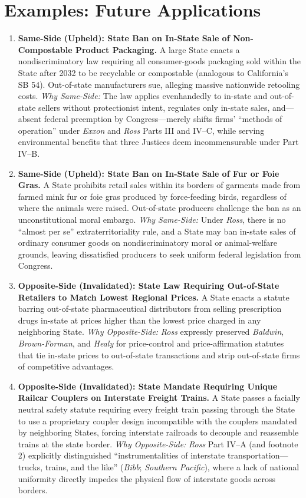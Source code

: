 \documentclass[12pt]{article}
\begin{document}
\section{Examples: Future Applications}
\begin{enumerate}
\item \textbf{Same-Side (Upheld): State Ban on In-State Sale of Non-Compostable Product Packaging.} A large State enacts a nondiscriminatory law requiring all consumer-goods packaging sold within the State after 2032 to be recyclable or compostable (analogous to California's SB 54). Out-of-state manufacturers sue, alleging massive nationwide retooling costs. \textit{Why Same-Side:} The law applies evenhandedly to in-state and out-of-state sellers without protectionist intent, regulates only in-state sales, and---absent federal preemption by Congress---merely shifts firms' ``methods of operation'' under \textit{Exxon} and \textit{Ross} Parts III and IV--C, while serving environmental benefits that three Justices deem incommensurable under Part IV--B.

\item \textbf{Same-Side (Upheld): State Ban on In-State Sale of Fur or Foie Gras.} A State prohibits retail sales within its borders of garments made from farmed mink fur or foie gras produced by force-feeding birds, regardless of where the animals were raised. Out-of-state producers challenge the ban as an unconstitutional moral embargo. \textit{Why Same-Side:} Under \textit{Ross}, there is no ``almost per se'' extraterritoriality rule, and a State may ban in-state sales of ordinary consumer goods on nondiscriminatory moral or animal-welfare grounds, leaving dissatisfied producers to seek uniform federal legislation from Congress.

\item \textbf{Opposite-Side (Invalidated): State Law Requiring Out-of-State Retailers to Match Lowest Regional Prices.} A State enacts a statute barring out-of-state pharmaceutical distributors from selling prescription drugs in-state at prices higher than the lowest price charged in any neighboring State. \textit{Why Opposite-Side:} \textit{Ross} expressly preserved \textit{Baldwin}, \textit{Brown-Forman}, and \textit{Healy} for price-control and price-affirmation statutes that tie in-state prices to out-of-state transactions and strip out-of-state firms of competitive advantages.

\item \textbf{Opposite-Side (Invalidated): State Mandate Requiring Unique Railcar Couplers on Interstate Freight Trains.} A State passes a facially neutral safety statute requiring every freight train passing through the State to use a proprietary coupler design incompatible with the couplers mandated by neighboring States, forcing interstate railroads to decouple and reassemble trains at the state border. \textit{Why Opposite-Side:} \textit{Ross} Part IV--A (and footnote 2) explicitly distinguished ``instrumentalities of interstate transportation---trucks, trains, and the like'' (\textit{Bibb}; \textit{Southern Pacific}), where a lack of national uniformity directly impedes the physical flow of interstate goods across borders.


\end{enumerate}
\end{document}
